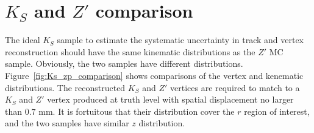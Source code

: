 \section{\texorpdfstring{$K_{S}$}{Ks} and \texorpdfstring{$Z'$}{Z'} comparison}
\label{app:syst_Ks_Zp}

The ideal $K_{S}$ sample to estimate the systematic uncertainty in track and vertex reconstruction should have the same kinematic distributions as the $Z'$ MC sample. Obviously, the two samples have different distributions. Figure~\ref{fig:Ks_zp_comparison} shows comparisons of the vertex and kenematic distributions. The reconstructed $K_{S}$ and $Z'$ vertices are required to match to a $K_{S}$ and $Z'$ vertex produced at truth level with spatial displacement no larger than $0.7$ mm. It is fortuitous that their distribution cover the $r$ region of interest, and the two samples have similar $z$ distribution.



